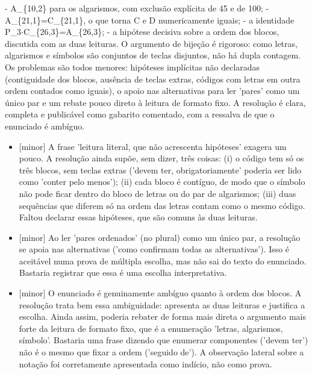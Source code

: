 \documentclass{article}%
\begin{document}
{-} A\_\{10,2\} para os algarismos, com exclusão explícita de 45 e de 100;\newline%
{-} A\_\{21,1\}=C\_\{21,1\}, o que torna C e D numericamente iguais;\newline%
{-} a identidade P\_3$\cdot$C\_\{26,3\}=A\_\{26,3\};\newline%
{-} a hipótese decisiva sobre a ordem dos blocos, discutida com as duas leituras.\newline%
\newline%
O argumento de bijeção é rigoroso: como letras, algarismos e símbolos são conjuntos de teclas disjuntos, não há dupla contagem. Os problemas são todos menores: hipóteses implícitas não declaradas (contiguidade dos blocos, ausência de teclas extras, códigos com letras em outra ordem contados como iguais), o apoio nas alternativas para ler 'pares' como um único par e um rebate pouco direto à leitura de formato fixo. A resolução é clara, completa e publicável como gabarito comentado, com a ressalva de que o enunciado é ambíguo.%
\begin{itemize}%
\item%
{[}minor{]} A frase 'leitura literal, que não acrescenta hipóteses' exagera um pouco. A resolução ainda supõe, sem dizer, três coisas: (i) o código tem só os três blocos, sem teclas extras ('devem ter, obrigatoriamente' poderia ser lido como 'conter pelo menos'); (ii) cada bloco é contíguo, de modo que o símbolo não pode ficar dentro do bloco de letras ou do par de algarismos; (iii) duas sequências que diferem só na ordem das letras contam como o mesmo código. Faltou declarar essas hipóteses, que são comuns às duas leituras.%
\item%
{[}minor{]} Ao ler 'pares ordenados' (no plural) como um único par, a resolução se apoia nas alternativas ('como confirmam todas as alternativas'). Isso é aceitável numa prova de múltipla escolha, mas não sai do texto do enunciado. Bastaria registrar que essa é uma escolha interpretativa.%
\item%
{[}minor{]} O enunciado é genuinamente ambíguo quanto à ordem dos blocos. A resolução trata bem essa ambiguidade: apresenta as duas leituras e justifica a escolha. Ainda assim, poderia rebater de forma mais direta o argumento mais forte da leitura de formato fixo, que é a enumeração 'letras, algarismos, símbolo'. Bastaria uma frase dizendo que enumerar componentes ('devem ter') não é o mesmo que fixar a ordem ('seguido de'). A observação lateral sobre a notação foi corretamente apresentada como indício, não como prova.%
\end{itemize}%
\end{document}
